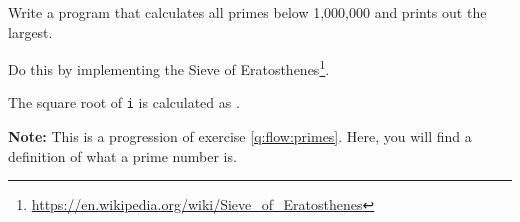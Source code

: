 Write a program that calculates all primes below 1,000,000 and prints out the largest.

Do this by implementing the Sieve of Eratosthenes\footnote{\url{https://en.wikipedia.org/wiki/Sieve_of_Eratosthenes}}.

The square root of \texttt{i} is calculated as .

\textbf{Note:} This is a progression of exercise \ref{q:flow:primes}. Here, you will find a definition of what a prime number is.

